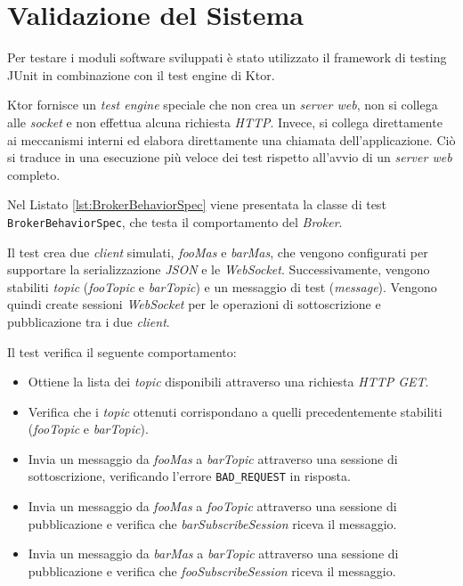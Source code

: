 \section{Validazione del Sistema}
Per testare i moduli software sviluppati è stato utilizzato il framework di testing JUnit in combinazione con il test engine di Ktor.

Ktor fornisce un \textit{test engine} speciale che non crea un \textit{server web}, non si collega alle \textit{socket} e non effettua alcuna richiesta \textit{HTTP}. Invece, si collega direttamente ai meccanismi interni ed elabora direttamente una chiamata dell'applicazione. Ciò si traduce in una esecuzione più veloce dei test rispetto all'avvio di un \textit{server web} completo.

Nel Listato \ref{lst:BrokerBehaviorSpec} viene presentata la classe di test \texttt{BrokerBehaviorSpec}, che testa il comportamento del \textit{Broker}.

Il test crea due \textit{client} simulati, \textit{fooMas} e \textit{barMas}, che vengono configurati per supportare la serializzazione \textit{JSON} e le \textit{WebSocket}. Successivamente, vengono stabiliti \textit{topic} (\textit{fooTopic} e \textit{barTopic}) e un messaggio di test (\textit{message}). Vengono quindi create sessioni \textit{WebSocket} per le operazioni di sottoscrizione e pubblicazione tra i due \textit{client}.

Il test verifica il seguente comportamento:

\begin{itemize}
    \item Ottiene la lista dei \textit{topic} disponibili attraverso una richiesta \textit{HTTP GET}.
    \item Verifica che i \textit{topic} ottenuti corrispondano a quelli precedentemente stabiliti (\textit{fooTopic} e \textit{barTopic}).
    \item Invia un messaggio da \textit{fooMas} a \textit{barTopic} attraverso una sessione di sottoscrizione, verificando l'errore \texttt{BAD\_REQUEST} in risposta.
    \item Invia un messaggio da \textit{fooMas} a \textit{fooTopic} attraverso una sessione di pubblicazione e verifica che \textit{barSubscribeSession} riceva il messaggio.
    \item Invia un messaggio da \textit{barMas} a \textit{barTopic} attraverso una sessione di pubblicazione e verifica che \textit{fooSubscribeSession} riceva il messaggio.
\end{itemize}

